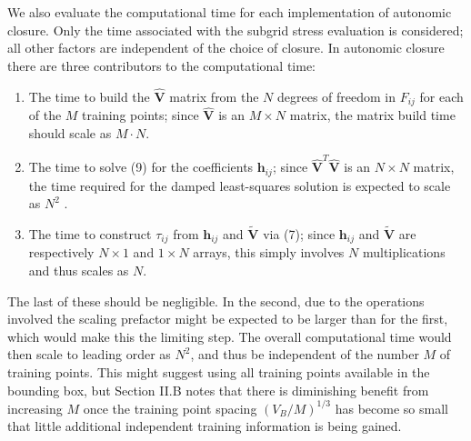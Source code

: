 We also evaluate the computational time for each implementation of autonomic closure. Only the time associated with the subgrid stress evaluation is considered; all other factors are independent of the choice of closure. In autonomic closure there are three contributors to the computational time:  
%
\begin{enumerate} 
	\item{The time to build the $\widehat{\mathbf{V}}$  matrix from the $N$ degrees of freedom in $F_{ij}$  for each of the $M$ training points; since  $\widehat{\mathbf{V}}$ is an  $M \times N$ matrix, the matrix build time should scale as $M \cdot N$.}
	\item{The time to solve (9) for the coefficients $\mathbf{h}_{ij}$; since $\widehat{\mathbf{V}}^{T} \widehat{\mathbf{V}}$   is an $N \times N$  matrix, the time required for the damped least-squares solution is expected to scale as $N^2$ .}
	\item{The time to construct  $\tau_{ij}$ from  $\mathbf{h}_{ij}$ and  $\widetilde{\mathbf{V}}$ via (7); since  $\mathbf{h}_{ij}$ and  $\widetilde{\mathbf{V}}$  are respectively $N \times 1$  and $1 \times N$  arrays, this simply involves $N$ multiplications and thus scales as $N$.}
\end{enumerate}
%
%
The last of these should be negligible. In the second, due to the operations involved the scaling prefactor might be expected to be larger than for the first, which would make this the limiting step. The overall computational time would then scale to leading order as $N^2$, and thus be independent of the number $M$ of training points. This might suggest using all training points available in the bounding box, but Section II.B notes that there is diminishing benefit from increasing $M$ once the training point spacing  $(V_B/M)^{1/3}$ has become so small that little additional independent training information is being gained.  

